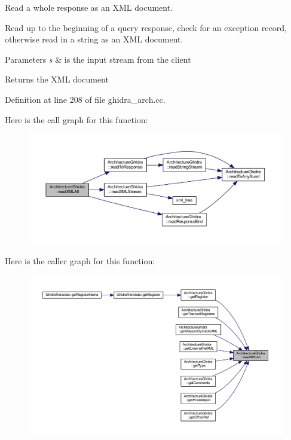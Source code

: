Read a whole response as an X\+ML document. 

Read up to the beginning of a query response, check for an exception record, otherwise read in a string as an X\+ML document. 
\begin{DoxyParams}{Parameters}
{\em s} & is the input stream from the client \\
\hline
\end{DoxyParams}
\begin{DoxyReturn}{Returns}
the X\+ML document 
\end{DoxyReturn}


Definition at line 208 of file ghidra\+\_\+arch.\+cc.

Here is the call graph for this function\+:
\nopagebreak
\begin{figure}[H]
\begin{center}
\leavevmode
\includegraphics[width=350pt]{class_architecture_ghidra_ae71b65457955432775931afde0d1c933_cgraph}
\end{center}
\end{figure}
Here is the caller graph for this function\+:
\nopagebreak
\begin{figure}[H]
\begin{center}
\leavevmode
\includegraphics[width=350pt]{class_architecture_ghidra_ae71b65457955432775931afde0d1c933_icgraph}
\end{center}
\end{figure}
\mbox{\label{class_architecture_ghidra_a76b1d30cc0f0f69f003ba3aceccd8063}} 
